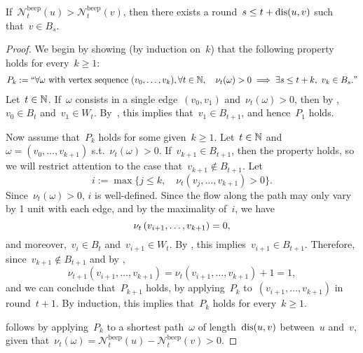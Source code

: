 \documentclass{article}
\newcommand{\beepcount}{\mathcal{N}^{\mathrm{beep}}}
\begin{document}
\begin{lemma} \label{lemma:traveling_beep}
    If~$\beepcount_t(u) > \beepcount_t(v)$, then there exists a round~$s \leq t+\mathrm{dis}(u,v)$ such that~$v \in B_s$.
\end{lemma}
\begin{proof}
    We begin by showing (by induction on~$k$) that the following property holds for every~$k \geq 1$:
    \begin{multline*}
        P_k := ``\forall \omega \text{ with vertex sequence } (v_0,\ldots,v_k), \forall t \in \operatorname{\mathbb{N}}, \quad
        \nu_t(\omega) > 0 \implies \exists s \leq t+k, ~ v_k \in B_s. "
    \end{multline*}
    Let~$t \in \operatorname{\mathbb{N}}$. If~$\omega$ consists in a single edge~$(v_0,v_1)$ and~$\nu_t(\omega) > 0$, then by , $v_0 \in B_t$ and~$v_1 \in W_t$. By~, this implies that~$v_1 \in B_{t+1}$, and hence~$P_1$ holds.

    Now assume that~$P_k$ holds for some given~$k\geq 1$.
    Let~$t \in \operatorname{\mathbb{N}}$ and~$\omega = (v_0,\ldots,v_{k+1})$ s.t.~$\nu_t(\omega) > 0$.
    If~$v_{k+1} \in B_{t+1}$, then the property holds, so we will restrict attention to the case that~$v_{k+1} \notin B_{t+1}$.
    Let
    \begin{equation*}
        i := \max \{j \leq k, \quad \nu_t(v_j,\ldots,v_{k+1}) > 0 \}.
    \end{equation*}
    Since~$\nu_t(\omega) > 0$, $i$ is well-defined. Since the flow along the path may only vary by 1 unit with each edge, and by the maximality of~$i$, we have
    \begin{equation*}
        \nu_t\left( v_{i+1},\ldots,v_{k+1} \right) = 0,
    \end{equation*}
    and moreover,~$v_i \in B_t$ and~$v_{i+1} \in W_t$. By , this implies~$v_{i+1} \in B_{t+1}$. Therefore, since~$v_{k+1} \notin B_{t+1}$ and by ,
    \begin{equation*}
        \nu_{t+1}(v_{i+1},\ldots,v_{k+1}) = \nu_t(v_{i+1},\ldots,v_{k+1}) + 1 = 1,
    \end{equation*}
    and we can conclude that~$P_{k+1}$ holds, by applying~$P_k$ to~$(v_{i+1},\ldots,v_{k+1})$ in round~$t+1$. By induction, this implies that~$P_k$ holds for every~$k \geq 1$.
    
     follows by applying~$P_k$ to a shortest path~$\omega$ of length~$\mathrm{dis}(u,v)$ between~$u$ and~$v$, given that~$\nu_t(\omega) = \beepcount_t(u) - \beepcount_t(v) > 0$.
\end{proof}
\end{document}
